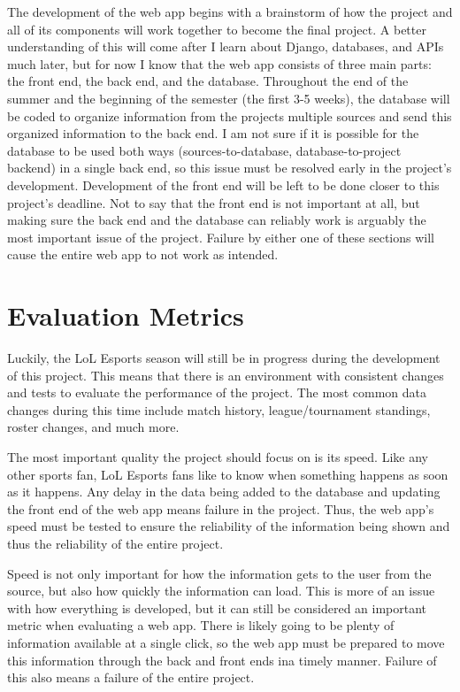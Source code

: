 \documentclass[10pt,twocolumn]{article}
\begin{document}
The development of the web app begins with a brainstorm of how the project and all of its components will work together to become the final project.
A better understanding of this will come after I learn about Django, databases, and APIs much later, but for now I know that the web app consists of three main parts: the front end, the back end, and the database.
Throughout the end of the summer and the beginning of the semester (the first 3-5 weeks), the database will be coded to organize information from the projects multiple sources and send this organized information to the back end.
I am not sure if it is possible for the database to be used both ways (sources-to-database, database-to-project backend) in a single back end, so this issue must be resolved early in the project's development.
Development of the front end will be left to be done closer to this project's deadline.
Not to say that the front end is not important at all, but making sure the back end and the database can reliably work is arguably the most important issue of the project.
Failure by either one of these sections will cause the entire web app to not work as intended.

\section{Evaluation Metrics}

Luckily, the LoL Esports season will still be in progress during the development of this project.
This means that there is an environment with consistent changes and tests to evaluate the performance of the project.
The most common data changes during this time include match history, league/tournament standings, roster changes, and much more.

The most important quality the project should focus on is its speed.
Like any other sports fan, LoL Esports fans like to know when something happens as soon as it happens.
Any delay in the data being added to the database and updating the front end of the web app means failure in the project.
Thus, the web app's speed must be tested to ensure the reliability of the information being shown and thus the reliability of the entire project.

Speed is not only important for how the information gets to the user from the source, but also how quickly the information can load.
This is more of an issue with how everything is developed, but it can still be considered an important metric when evaluating a web app.
There is likely going to be plenty of information available at a single click, so the web app must be prepared to move this information through the back and front ends ina timely manner.
Failure of this also means a failure of the entire project.
\end{document}
